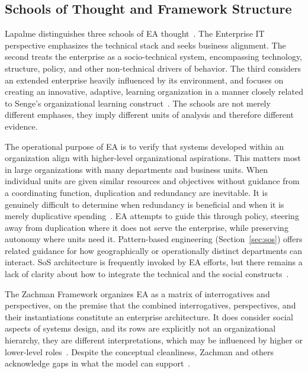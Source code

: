\documentclass{csimq}
\begin{document}
\subsection{Schools of Thought and Framework Structure}

Lapalme distinguishes three schools of EA thought~\cite{lapalme2012}. The
Enterprise IT perspective emphasizes the technical stack and seeks
business alignment. The second treats the enterprise as a socio-technical
system, encompassing technology, structure, policy, and other non-technical
drivers of behavior. The third considers an extended enterprise heavily
influenced by its environment, and focuses on creating an innovative, adaptive,
learning organization in a manner closely related to Senge's organizational
learning construct~\cite{senge2018}. The schools are not merely different
emphases, they imply different units of analysis and therefore different
evidence.

The operational purpose of EA is to verify that systems developed within an
organization align with higher-level organizational aspirations. This matters
most in large organizations with many departments and business units. When
individual units are given similar resources and objectives without guidance
from a coordinating function, duplication and redundancy are inevitable. It
is genuinely difficult to determine when redundancy is beneficial and when it is
merely duplicative spending~\cite{landau1969,mocker2009}. EA attempts to guide this through
policy, steering away from duplication where it does not serve the enterprise,
while preserving autonomy where units need it. Pattern-based engineering
(Section~\ref{sec:sos}) offers related guidance for how geographically or
operationally distinct departments can interact. SoS architecture is frequently
invoked by EA efforts, but there remains a lack of clarity about how to
integrate the technical and the social
constructs~\cite{nielsen2015}.

The Zachman Framework organizes EA as a matrix of interrogatives and
perspectives, on the premise that the combined interrogatives, perspectives, and
their instantiations constitute an enterprise architecture. It does consider
social aspects of systems design, and its rows are explicitly not an
organizational hierarchy, they are different interpretations, which may be
influenced by higher or lower-level roles~\cite{zachman_nd}. Despite the
conceptual cleanliness, Zachman and others acknowledge gaps in what the model can
support~\cite{lapalme2016}.
\end{document}
